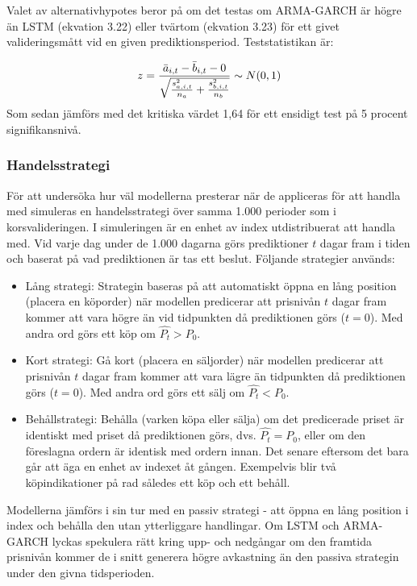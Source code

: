 \documentclass[11pt]{article}
\numberwithin{equation}{section}
\numberwithin{table}{section}
\numberwithin{figure}{section}
\begin{document}
Valet av alternativhypotes beror på om det testas om ARMA-GARCH är högre än LSTM (ekvation 3.22) eller tvärtom (ekvation 3.23) för ett givet valideringsmått vid en given prediktionsperiod. Teststatistikan är: 

\begin{equation}
    z = \frac{\Bar{a}_{i,t} - \Bar{b}_{i,t} - 0}{\sqrt{\frac{s_{a,i,t}^2}{n_a}+\frac{s_{b,i,t}^2}{n_b}}} \sim N(0,1)
\end{equation}
Som sedan jämförs med det kritiska värdet 1,64 för ett ensidigt test på 5 procent signifikansnivå.


\subsubsection{Handelsstrategi}
För att undersöka hur väl modellerna presterar när de appliceras för att handla med simuleras en handelsstrategi över samma 1.000 perioder som i korsvalideringen. I simuleringen är en enhet av index utdistribuerat att handla med. Vid varje dag under de 1.000 dagarna görs prediktioner $t$ dagar fram i tiden och baserat på vad prediktionen är tas ett beslut. Följande strategier används:

\begin{itemize}
    \item Lång strategi: Strategin baseras på att automatiskt öppna en lång position (placera en köporder) när modellen predicerar att prisnivån $t$ dagar fram kommer att vara högre än vid tidpunkten då prediktionen görs ($t=0$). Med andra ord görs ett köp om $\hat{P_t} > P_0$.
    \item Kort strategi: Gå kort (placera en säljorder) när modellen predicerar att prisnivån $t$ dagar fram kommer att vara lägre än tidpunkten då prediktionen görs ($t=0$). Med andra ord görs ett sälj om $\hat{P_t} < P_0$.
    \item Behållstrategi: Behålla (varken köpa eller sälja) om det predicerade priset är identiskt med priset då prediktionen görs, dvs. $\hat{P_t} = P_0$, eller om den föreslagna ordern är identisk med ordern innan. Det senare eftersom det bara går att äga en enhet av indexet åt gången. Exempelvis blir två köpindikationer på rad således ett köp och ett behåll.
\end{itemize}

Modellerna jämförs i sin tur med en passiv strategi - att öppna en lång position i index och behålla den utan ytterliggare handlingar. Om LSTM och ARMA-GARCH lyckas spekulera rätt kring upp- och nedgångar om den framtida prisnivån kommer de i snitt generera högre avkastning än den passiva strategin under den givna tidsperioden.
\end{document}
